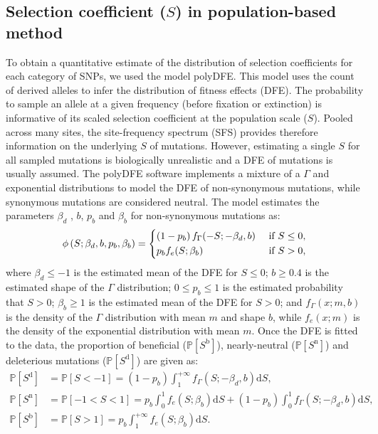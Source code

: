 \documentclass{article}
\newcommand{\der}{\text{d}}
\newcommand{\proba}{\mathbb{P}}
\newcommand{\Spop}{S}
\newcommand{\PpolyDel}{\proba [ \Spop^{\text{d}}]}
\newcommand{\PpolyNeutral}{\proba [ \Spop^{\text{n}} ]}
\newcommand{\PpolyAdv}{\proba [ \Spop^{\text{b}} ]}
\newcommand{\AdvMean}{\beta_b}
\newcommand{\DelMean}{\beta_d}
\begin{document}
    \subsection{Selection coefficient ($\Spop$) in population-based method}
    \label{subsec:s-polymorphism-method}
    To obtain a quantitative estimate of the distribution of selection coefficients for each category of SNPs, we used the model polyDFE\cite{tataru_inference_2017, tataru_polydfe_2020}.
    This model uses the count of derived alleles to infer the distribution of fitness effects (DFE).
    The probability to sample an allele at a given frequency (before fixation or extinction) is informative of its scaled selection coefficient at the population scale ($\Spop$).
    Pooled across many sites, the site-frequency spectrum (SFS) provides therefore information on the underlying $\Spop$ of mutations.
    However, estimating a single $\Spop$ for all sampled mutations is biologically unrealistic and a DFE of mutations is usually assumed\cite{eyre-walker_distribution_2006, eyre-walker_estimating_2009}.
    The polyDFE\cite{tataru_inference_2017, tataru_polydfe_2020} software implements a mixture of a $\Gamma$ and exponential distributions to model the DFE of non-synonymous mutations, while synonymous mutations are considered neutral.
    The model estimates the parameters $\DelMean$ , $b$, $p_b$ and $\AdvMean$ for non-synonymous mutations as:
    \begin{equation}
        \phi \left( \Spop; \DelMean , b, p_b, \AdvMean \right) =
        \begin{dcases}
            \left( 1 - p_b \right) f_{\Gamma}(-\Spop; -\DelMean, b) & \text{ if $\Spop \leq 0$,} \\
            p_b f_{e}(\Spop; \AdvMean) & \text{ if $\Spop > 0$,} \\
        \end{dcases}
    \end{equation}
    where $\DelMean \leq -1 $ is the estimated mean of the DFE for $\Spop \leq 0$;
    $b \geq 0.4$ is the estimated shape of the $\Gamma$ distribution;
    $0 \leq p_b \leq 1$ is the estimated probability that $\Spop > 0$;
    $\AdvMean \geq 1$ is the estimated mean of the DFE for $\Spop > 0$;
    and $f_{\Gamma}(x; m, b)$ is the density of the $\Gamma$ distribution with mean $m$ and shape $b$, while $f_{e}(x; m)$ is the density of the exponential distribution with mean $m$.
    Once the DFE is fitted to the data, the proportion of beneficial ($\PpolyAdv$), nearly-neutral ($\PpolyNeutral$) and deleterious mutations ($\PpolyDel$) are given as:
    \begin{align}
        \PpolyDel &= \proba [ \Spop < -1] = \left( 1 - p_b \right) \int_{1}^{+\infty} f_{\Gamma}(\Spop; -\DelMean, b) \der \Spop, \label{eq:polyProbaDel} \\
        \PpolyNeutral &= \proba [ -1 < \Spop < 1] = p_b \int_{0}^{1} f_{e}(\Spop; \AdvMean) \der \Spop + \left( 1 - p_b \right) \int_{0}^{1} f_{\Gamma}(\Spop; -\DelMean, b) \der \Spop, \\
        \PpolyAdv &= \proba [ \Spop > 1] = p_b \int_{1}^{+\infty} f_{e}(\Spop; \AdvMean) \der \Spop. \label{eq:polyProbaAdv}
    \end{align}
\end{document}
